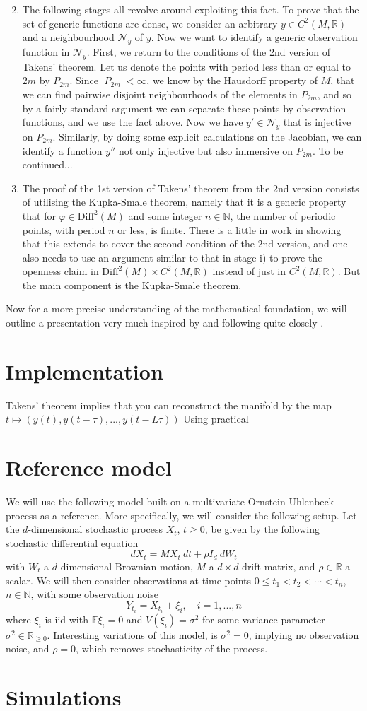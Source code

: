 \documentclass[11pt, a4paper]{memoir}
\theoremstyle{plain}
\theoremstyle{definition}
\newcommand{\mN}{\mathbb{N}}
\newcommand{\mR}{\mathbb{R}}
\begin{document}
\begin{enumerate}[label=\roman*)]
	\setcounter{enumi}{1}
	\item The following stages all revolve around exploiting this fact. To prove that the set of generic functions are dense, we consider an arbitrary $y\in C^2(M,\mR)$ and a neighbourhood $\mathcal{N}_y$ of $y$. Now we want to identify a generic observation function in $\mathcal{N}_y$. First, we return to the conditions of the 2nd version of Takens' theorem. Let us denote the points with period less than or equal to $2m$ by $P_{2m}$. Since $|P_{2m}|<\infty$, we know by the Hausdorff property of $M$, that we can find pairwise disjoint neighbourhoods of the elements in $P_{2m}$, and so by a fairly standard argument we can separate these points by observation functions, and we use the fact above. Now we have $y'\in\mathcal{N}_y$ that is injective on $P_{2m}$. Similarly, by doing some explicit calculations on the Jacobian, we can identify a function $y''$ not only injective but also immersive on $P_{2m}$. To be continued...
	\item The proof of the 1st version of Takens' theorem from the 2nd version consists of utilising the Kupka-Smale theorem, namely that it is a generic property that for $\varphi\in \text{Diff}^2(M)$ and some integer $n\in \mN$, the number of periodic points, with period $n$ or less, is finite. There is a little in work in showing that this extends to cover the second condition of the 2nd version, and one also needs to use an argument similar to that in stage i) to prove the openness claim in $\text{Diff}^2(M)\times C^2(M,\mR)$ instead of just in $C^2(M,\mR)$. But the main component is the Kupka-Smale theorem.
\end{enumerate}  
Now for a more precise understanding of the mathematical foundation, we will outline a presentation very much inspired by and following quite closely \cite{mathFound}.
\section{Implementation}
Takens' theorem implies that you can reconstruct the manifold by the map
$t\mapsto (y(t),y(t-\tau),...,y(t-L\tau))$
Using practical  
\section{Reference model}
We will use the following model built on a multivariate Ornstein-Uhlenbeck process as a reference. More specifically, we will consider the following setup. Let the $d$-dimensional stochastic process $X_t$, $t\geq 0$, be given by the following stochastic differential equation
$$dX_t=M X_t\ dt+\rho I_d\ dW_t$$
with $W_t$ a $d$-dimensional  Brownian motion, $M$ a $d\times d$ drift matrix, and $\rho\in \mathbb{R}$ a scalar. We will then consider observations at time points $0\leq t_1<t_2<\cdots <t_n$, $n\in \mathbb{N}$, with some observation noise
$$Y_{t_i}=X_{t_i}+\xi_i,\quad i=1,...,n$$
where $\xi_i$ is iid with $\mathbb{E} \xi_i=0$ and $V(\xi_i)=\sigma^2$ for some variance parameter $\sigma^2\in \mathbb{R}_{\geq 0}$. Interesting variations of this model, is $\sigma^2=0$, implying no observation noise, and $\rho=0$, which removes stochasticity of the process.


\section{Simulations}
 
 



\end{document}
